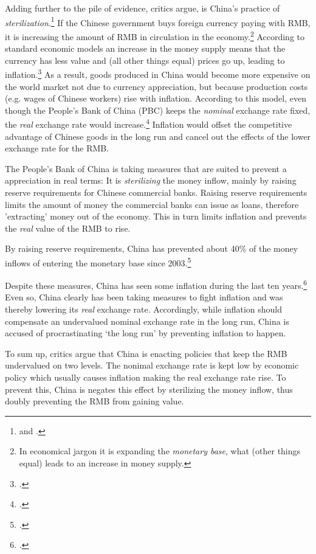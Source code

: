Adding further to the pile of evidence, critics argue, is China's 
practice of \emph{sterilization}.\footnote{\cite{Humpage2010} and \cite{Wang2011}.} If the Chinese government buys foreign 
currency paying with RMB, it is increasing the amount of RMB in 
circulation in the economy.\footnote{In economical jargon it is 
expanding the \emph{monetary base}, what (other things equal) leads to 
an increase in money supply.} According to standard economic models an 
increase in the money supply means that the currency has less value and 
(all other things equal) prices go up, leading to 
inflation.\footnote{\cite[pp. 432]{Krugman2008}.}
As a result, goods produced in China would become more expensive on the 
world market not due to currency appreciation, but because production 
costs (e.g. wages of Chinese workers) rise with inflation. According to 
this model, even though the People's Bank of China (PBC) keeps the 
\emph{nominal} exchange rate fixed, the \emph{real} exchange rate would 
increase.\footnote{\cite[p. 509]{Krugman2008}.} Inflation would offset the 
competitive advantage of Chinese goods in the long run and cancel out 
the effects of the lower exchange rate for the RMB.

The People's Bank of China is taking measures that are suited to prevent 
a appreciation in real terms: It is \emph{sterilizing} the money inflow, 
mainly by raising reserve requirements for Chinese commercial banks. 
Raising reserve requirements limits the amount of money the commercial 
banks can issue as loans, therefore 'extracting' money out of the 
economy. This in turn limits inflation and prevents the \emph{real} 
value of the RMB to rise. 

By raising reserve requirements, China has prevented about 40\% of the money 
inflows of entering the monetary base since 2003.\footnote{\cite{Humpage2010}.}%

Despite these measures, China has seen some inflation during the last 
ten years.\footnote{\cite{Humpage2010}.} Even so, China clearly has been 
taking measures to fight inflation and was thereby lowering its 
\emph{real} exchange rate. Accordingly, while inflation should 
compensate an undervalued nominal exchange rate in the long run, China 
is accused of procrastinating `the long run' by preventing inflation to 
happen.

To sum up, critics argue that China is enacting policies that keep the 
RMB undervalued on two levels. The nonimal exchange rate is kept low by 
economic policy which usually causes inflation making the real exchange 
rate rise. To prevent this, China is negates this effect by sterilizing 
the money inflow, thus doubly preventing the RMB from gaining value.

